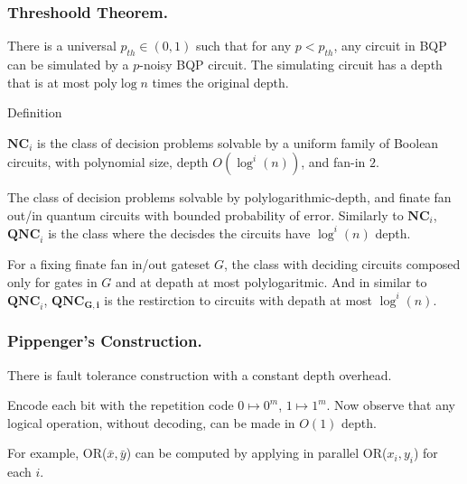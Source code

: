 \documentclass{beamer}
\newcommand*{\QNC}{ \mathbf{QNC} }
\newcommand*{\QNCG}{ \mathbf{QNC_G} }
\newcommand*{\NC}{\mathbf{NC}}
\newcommand*{\QNCiG}{\mathbf{QNC_{G,i}}}
\begin{document}
\begin{frame}
  \frametitle{Threshoold Theorem.} 
  \begin{theorem}
There is a universal $p_{th} \in (0,1)$ such that for any $p < p_{th}$, any circuit in BQP can be simulated by a $p$-noisy BQP circuit. The simulating circuit has a depth that is at most $\text{poly} \log n$ times the original depth.
  \end{theorem}
\end{frame}



\begin{frame}{Definition}
\begin{definition}[$\NC$ - Nick's Class]
$\NC_i$ is the class of decision problems solvable by a uniform family of Boolean circuits, with polynomial size, depth $O(\log^i(n))$, and fan-in $2$. 
\end{definition}

\begin{definition}[$\QNC$]
  The class of decision problems solvable by polylogarithmic-depth, and finate fan out/in quantum circuits with bounded probability of error. Similarly to $\NC_i$, $\QNC_i$ is the class where the decisdes the circuits have $\log^i (n)$ depth.  
\end{definition}

\begin{definition}[$\QNCG$]
  For a fixing finate fan in/out gateset $G$, the class with deciding circuits composed only for gates in $G$ and at depath at most polylogaritmic. And in similar to $\QNC_{i}$, $\QNCiG$ is the restirction to circuits with depath at most $\log^{i}(n)$.  
\end{definition}
\end{frame}

\begin{frame}
  \frametitle{Pippenger's Construction.} 
  
  \begin{theorem}
    There is fault tolerance construction with a constant depth overhead.
  \end{theorem}
Encode each bit with the repetition code $0 \mapsto 0^{m}$, $1 \mapsto 1^{m}$. Now observe that any logical operation, without decoding, can be made in $O(1)$ depth.

For example, OR($\bar{x}, \bar{y}$) can be computed by applying in parallel OR($x_{i}, y_{i}$) for each $i$.

\end{frame}
\end{document}
